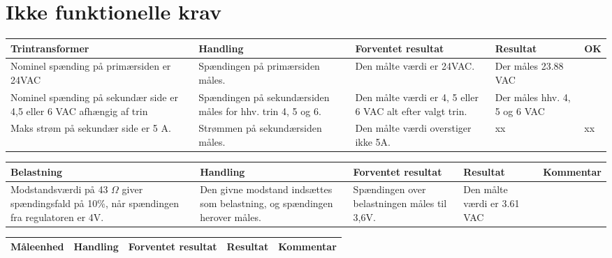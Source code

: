 \section{Ikke funktionelle krav}
\begin{table}[htbp]
	\centering
	\begin{tabular}{|p{4cm}|p{3cm}|p{4cm}|p{3.5cm}|p{1cm}|}
		\hline
		\textbf{Trintransformer} & \textbf{Handling} & \textbf{Forventet resultat} & \textbf{Resultat} &\textbf{OK} \\\hline
		Nominel spænding på primærsiden er 24VAC & Spændingen på primærsiden måles. & Den målte værdi er 24VAC. & Der måles 23.88 VAC & \checkmark \\\hline
		Nominel spænding på sekundær side er 4,5 eller 6 VAC afhængig af trin & Spændingen på sekundærsiden måles for hhv. trin 4, 5 og 6. & Den målte værdi er 4, 5 eller 6 VAC alt efter valgt trin. & Der måles hhv. 4, 5 og 6 VAC & \checkmark \\\hline
		Maks strøm på sekundær side er 5 A. & Strømmen på sekundærsiden måles. & Den målte værdi overstiger ikke 5A. & xx  & xx \\\hline
	\end{tabular}
	
\end{table}

\begin{table}[htbp]
	\centering
	\begin{tabular}{|p{4cm}|p{3cm}|p{4cm}|p{2cm}|p{2.5cm}|}
		\hline
		\textbf{Belastning} & \textbf{Handling} & \textbf{Forventet resultat} & \textbf{Resultat} &\textbf{Kommentar} \\\hline
		Modstandsværdi på 43 $\Omega$ giver spændingsfald på 10\%, når spændingen fra regulatoren er 4V. & Den givne modstand indsættes som belastning, og spændingen herover måles. & Spændingen over belastningen måles til 3,6V. & Den målte værdi er 3.61 VAC & \checkmark \\\hline	
	\end{tabular}

	
\end{table}

\begin{table}[htbp]
	\centering
	\begin{tabular}{|p{4cm}|p{3cm}|p{4cm}|p{2cm}|p{2.5cm}|}
		\hline
		\textbf{Måleenhed} & \textbf{Handling} & \textbf{Forventet resultat} & \textbf{Resultat} &\textbf{Kommentar} \\\hline
			
	\end{tabular}
	
	
\end{table}